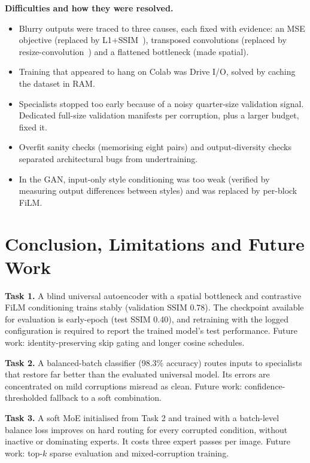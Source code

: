 \documentclass[conference]{IEEEtran}
\begin{document}
\textbf{Difficulties and how they were resolved.}
\begin{itemize}
\item Blurry outputs were traced to three causes, each fixed with evidence: an MSE objective (replaced by L1+SSIM~\cite{zhao2017loss}), transposed convolutions (replaced by resize-convolution~\cite{odena2016}) and a flattened bottleneck (made spatial).
\item Training that appeared to hang on Colab was Drive I/O, solved by caching the dataset in RAM.
\item Specialists stopped too early because of a noisy quarter-size validation signal. Dedicated full-size validation manifests per corruption, plus a larger budget, fixed it.
\item Overfit sanity checks (memorising eight pairs) and output-diversity checks separated architectural bugs from undertraining.
\item In the GAN, input-only style conditioning was too weak (verified by measuring output differences between styles) and was replaced by per-block FiLM.
\end{itemize}

\section{Conclusion, Limitations and Future Work}
\textbf{Task 1.} A blind universal autoencoder with a spatial bottleneck and contrastive FiLM conditioning trains stably (validation SSIM 0.78). The checkpoint available for evaluation is early-epoch (test SSIM 0.40), and retraining with the logged configuration is required to report the trained model's test performance. Future work: identity-preserving skip gating and longer cosine schedules.

\textbf{Task 2.} A balanced-batch classifier (98.3\% accuracy) routes inputs to specialists that restore far better than the evaluated universal model. Its errors are concentrated on mild corruptions misread as clean. Future work: confidence-thresholded fallback to a soft combination.

\textbf{Task 3.} A soft MoE initialised from Task 2 and trained with a batch-level balance loss improves on hard routing for every corrupted condition, without inactive or dominating experts. It costs three expert passes per image. Future work: top-$k$ sparse evaluation and mixed-corruption training.
\end{document}
